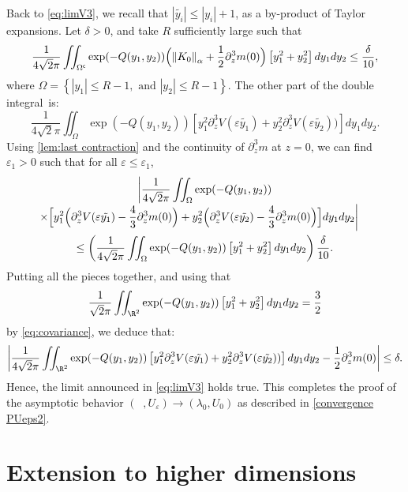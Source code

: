 \documentclass[JEP,XML,SOM,Unicode]{cedram}
\theoremstyle{plain}
\theoremstyle{definition}
\newcommand{\comega}{\Omega^{\mathsf{c}}}
\let\eps\varepsilon
\newcommand{\abs}[1]{\left\lvert#1\right\rvert}
\newcommand{\nalph}[1]{\left\lVert#1\right\rVert_\alpha}
\DeclareMathOperator{\lep}{\lambda_\varepsilon}
\begin{document}
Back to \eqref{eq:limV3}, we recall that $\abs{\tilde{y_i}} \leq \abs{ y_i}+1$, as a by-product of Taylor expansions. Let $\delta>0$, and take $R$ sufficiently large such that
\begin{equation*}
\dfrac{1}{4\sqrt{2}\pi}\iint _{\comega} \exp(-Q (y_1,y_2)) \Bigl (\nalph{K_0} + \dfrac12 \partial_z^3m(0)\Bigr) \left[ y_1^2 + y_2^2 \right] dy_1dy_2
\leq \frac\delta{10},
\end{equation*}
where $\Omega = \left\{ \abs{y_1} \leq R - 1, \text{ and } \abs{y_2} \leq R - 1 \right\}$. The other part of the double integral~is:
\begin{equation*}
\dfrac{1}{4\sqrt{2}\pi}\iint _{\Omega} \exp(-Q (y_1,y_2)) \left[ y_1^2 \partial_z^3 V(\eps \tilde{y_1}) + y_2^2 \partial_z^3 V(\eps \tilde{y_2})) \right] dy_1dy_2.
\end{equation*}
Using \cref{lem:last contraction} and the continuity of $\partial_z^3m$ at $z = 0$, we can find $\eps_1>0$ such that for all $\eps\leq \eps_1$,
\begin{multline*}
\biggl|\dfrac{1}{4\sqrt{2}\pi}\iint _{\Omega} \exp(-Q (y_1,y_2))\\[-3pt]
\shoveright{\times\Bigl[ y_1^2 \Bigl (\partial_z^3 V(\eps \tilde{y_1})- \dfrac43 \partial_z^3m(0)\Bigr) + y_2^2 \Bigl (\partial_z^3 V(\eps \tilde{y_2})- \dfrac43 \partial_z^3m(0)\Bigr) \Bigr] dy_1dy_2 \biggr|}\\
\leq \left (\dfrac{1}{4\sqrt{2}\pi}\iint _{\Omega} \exp(-Q (y_1,y_2)) \left[ y_1^2 + y_2^2 \right] dy_1dy_2\right) \dfrac{\delta}{10}.
\end{multline*}
Putting all the pieces together, and using that $$\frac1{\sqrt{2}\pi} \iint_{\R^2} \exp(-Q (y_1,y_2)) \left[ y_1^2 + y_2^2 \right] dy_1dy_2 = \frac32$$ by \eqref{eq:covariance}, we deduce that:
\begin{equation*}
\abs{\dfrac{1}{4\sqrt{2}\pi} \iint _{\R^2} \exp(-Q (y_1,y_2)) \left[ y_1^2 \partial_z^3 V(\eps \tilde{y_1}) + y_2^2 \partial_z^3 V(\eps \tilde{y_2})) \right] dy_1dy_2 - \dfrac12 \partial_z^3m(0)} \leq \delta.
\end{equation*}
Hence, the limit announced in \eqref{eq:limV3} holds true. This completes the proof of the asymp\-totic behavior $(\lep, U_\eps)\to (\lambda_0,U_0)$ as described in \eqref{convergence PUeps2}.

\section{Extension to higher dimensions}\label{sec large dim}
\end{document}

